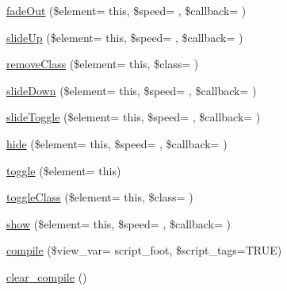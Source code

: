 \begin{DoxyCompactItemize}
\item 
\hyperlink{class_c_i___javascript_a4afea7e253d0005b0246c54454af8e08}{fade\+Out} (\$element= \textquotesingle{}this\textquotesingle{}, \$speed= \textquotesingle{}\textquotesingle{}, \$callback= \textquotesingle{}\textquotesingle{})
\item 
\hyperlink{class_c_i___javascript_a03921f68a26b4fa42ae74e9539b9f8cb}{slide\+Up} (\$element= \textquotesingle{}this\textquotesingle{}, \$speed= \textquotesingle{}\textquotesingle{}, \$callback= \textquotesingle{}\textquotesingle{})
\item 
\hyperlink{class_c_i___javascript_a23b05acfb5f984950d0f87dfcea02511}{remove\+Class} (\$element= \textquotesingle{}this\textquotesingle{}, \$class= \textquotesingle{}\textquotesingle{})
\item 
\hyperlink{class_c_i___javascript_a77761c7dd96b9fc3ce4f747fb39bea23}{slide\+Down} (\$element= \textquotesingle{}this\textquotesingle{}, \$speed= \textquotesingle{}\textquotesingle{}, \$callback= \textquotesingle{}\textquotesingle{})
\item 
\hyperlink{class_c_i___javascript_acd13a8b79a9b4e4ed5e1b9c4f6051ca4}{slide\+Toggle} (\$element= \textquotesingle{}this\textquotesingle{}, \$speed= \textquotesingle{}\textquotesingle{}, \$callback= \textquotesingle{}\textquotesingle{})
\item 
\hyperlink{class_c_i___javascript_a1de0e2ddc6b45ec4dc5eafcadfcc0791}{hide} (\$element= \textquotesingle{}this\textquotesingle{}, \$speed= \textquotesingle{}\textquotesingle{}, \$callback= \textquotesingle{}\textquotesingle{})
\item 
\hyperlink{class_c_i___javascript_a43a546a5662b09af35c814f3c996a9d6}{toggle} (\$element= \textquotesingle{}this\textquotesingle{})
\item 
\hyperlink{class_c_i___javascript_aa2a46723b34a171f4287bca57c53b7d3}{toggle\+Class} (\$element= \textquotesingle{}this\textquotesingle{}, \$class= \textquotesingle{}\textquotesingle{})
\item 
\hyperlink{class_c_i___javascript_aa025222c28ab975bc989225f76d7d9f3}{show} (\$element= \textquotesingle{}this\textquotesingle{}, \$speed= \textquotesingle{}\textquotesingle{}, \$callback= \textquotesingle{}\textquotesingle{})
\item 
\hyperlink{class_c_i___javascript_ac903bb7461504041c392c06f23fc27b8}{compile} (\$view\+\_\+var= \textquotesingle{}script\+\_\+foot\textquotesingle{}, \$script\+\_\+tags=T\+R\+U\+E)
\item 
\hyperlink{class_c_i___javascript_a4e3a7e7ffc20e8f578a0d66f52def10d}{clear\+\_\+compile} ()

\end{DoxyCompactItemize}
